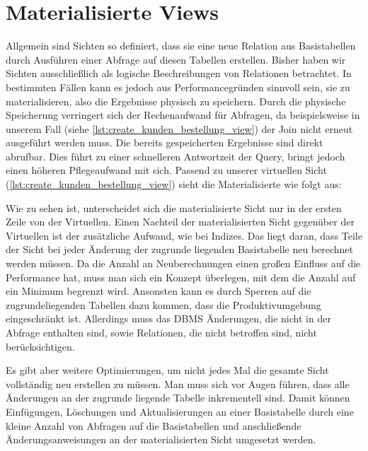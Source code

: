 \section{Materialisierte Views}\label{sec:materialisierte-views}

Allgemein sind Sichten so definiert, dass sie eine neue Relation aus Basistabellen durch Ausführen einer Abfrage auf diesen Tabellen erstellen.
Bisher haben wir Sichten ausschließlich als logische Beschreibungen von Relationen betrachtet.
In bestimmten Fällen kann es jedoch aus Performancegründen sinnvoll sein, sie zu materialisieren, also die Ergebnisse physisch zu speichern.
Durch die physische Speicherung verringert sich der Rechenaufwand für Abfragen, da beispielsweise in unserem Fall (siehe \ref{lst:create_kunden_bestellung_view}) der Join nicht erneut ausgeführt werden muss.
Die bereits gespeicherten Ergebnisse sind direkt abrufbar.
Dies führt zu einer schnelleren Antwortzeit der Query, bringt jedoch einen höheren Pflegeaufwand mit sich.
Passend zu unserer virtuellen Sicht (\ref{lst:create_kunden_bestellung_view}) sieht die Materialisierte wie folgt aus:

\vspace{-5pt}


Wie zu sehen ist, unterscheidet sich die materialisierte Sicht nur in der ersten Zeile von der Virtuellen.
Einen Nachteil der materialisierten Sicht gegenüber der Virtuellen ist der zusätzliche Aufwand, wie bei Indizes.
Das liegt daran, dass Teile der Sicht bei jeder Änderung der zugrunde liegenden Basistabelle neu berechnet werden müssen.
Da die Anzahl an Neuberechnungen einen großen Einfluss auf die Performance hat, muss man sich ein Konzept überlegen, mit dem die Anzahl auf ein Minimum begrenzt wird.
Ansonsten kann es durch Sperren auf die zugrundeliegenden Tabellen dazu kommen, dass die Produktivumgebung eingeschränkt ist.
Allerdings muss das DBMS Änderungen, die nicht in der Abfrage enthalten sind, sowie Relationen, die nicht betroffen sind, nicht berücksichtigen.

Es gibt aber weitere Optimierungen, um nicht jedes Mal die gesamte Sicht vollständig neu erstellen zu müssen.
Man muss sich vor Augen führen, dass alle Änderungen an der zugrunde liegende Tabelle inkrementell sind.
Damit können Einfügungen, Löschungen und Aktualisierungen an einer Basistabelle durch eine kleine Anzahl von Abfragen auf die Basistabellen und anschließende Änderungsanweisungen an der materialisierten Sicht umgesetzt werden.

